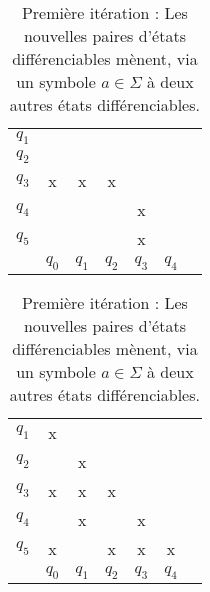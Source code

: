\begin{example}
\begin{table}[H]
\begin{subtable}{.5\textwidth}
\centering
 \begin{tabular}{ccccccc}
	 \cline{2-2}
	 \multicolumn{1}{c|}{$q_1$} & \multicolumn{1}{c|}{} &&&&\\
	 \cline{2-3}
	 \multicolumn{1}{c|}{$q_2$} & \multicolumn{1}{c|}{} &\multicolumn{1}{c|}{}&&&\\
	 \cline{2-4}
	 \multicolumn{1}{c|}{$q_3$} & \multicolumn{1}{c|}{x} &\multicolumn{1}{c|}{x}&\multicolumn{1}{c|}{x}&&\\
	 \cline{2-5}
	 \multicolumn{1}{c|}{$q_4$} & \multicolumn{1}{c|}{} &\multicolumn{1}{c|}{}&\multicolumn{1}{c|}{}&\multicolumn{1}{c|}{x}&\\
	 \cline{2-6}
	 \multicolumn{1}{c|}{$q_5$} & \multicolumn{1}{c|}{} & \multicolumn{1}{c|}{}&\multicolumn{1}{c|}{}&\multicolumn{1}{c|}{x}&\multicolumn{1}{c|}{}\\
	 \cline{2-6}
	 \multicolumn{1}{c}{} & $q_0$&$q_1$&$q_2$&$q_3$&$q_4$\\
\end{tabular}
\caption{Cas de base : tous les états sont différents de $q_3$}
\end{subtable}
\begin{subtable}{.5\textwidth}
\centering
 \begin{tabular}{ccccccc}
	 \cline{2-2}
	 \multicolumn{1}{c|}{$q_1$} & \multicolumn{1}{c|}{x} &&&&\\
	 \cline{2-3}
	 \multicolumn{1}{c|}{$q_2$} & \multicolumn{1}{c|}{} &\multicolumn{1}{c|}{x}&&&\\
	 \cline{2-4}
	 \multicolumn{1}{c|}{$q_3$} & \multicolumn{1}{c|}{x} &\multicolumn{1}{c|}{x}&\multicolumn{1}{c|}{x}&&\\
	 \cline{2-5}
	 \multicolumn{1}{c|}{$q_4$} & \multicolumn{1}{c|}{} &\multicolumn{1}{c|}{x}&\multicolumn{1}{c|}{}&\multicolumn{1}{c|}{x}&\\
	 \cline{2-6}
	 \multicolumn{1}{c|}{$q_5$} & \multicolumn{1}{c|}{x} & \multicolumn{1}{c|}{}&\multicolumn{1}{c|}{x}&\multicolumn{1}{c|}{x}&\multicolumn{1}{c|}{x}\\
	 \cline{2-6}
	 \multicolumn{1}{c}{} & $q_0$&$q_1$&$q_2$&$q_3$&$q_4$\\
 \end{tabular}
 \caption{Première itération : Les nouvelles paires d'états différenciables mènent, via un symbole $a \in \Sigma$ à deux autres états différenciables.}
 \end{subtable}


\end{table}
\end{example}
